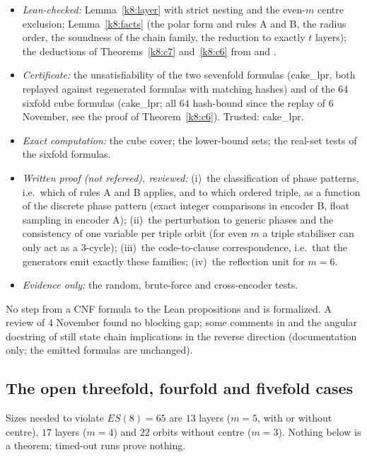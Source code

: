 \begin{itemize}
\item\emph{Lean-checked:} Lemma~\ref{k8:layer} with strict nesting and the even-$m$ centre exclusion;
Lemma~\ref{k8:facts} (the polar form and rules A and B, the radius order, the soundness of the chain family, the
reduction to exactly $t$ layers); the deductions of Theorems~\ref{k8:c7} and~\ref{k8:c6} from  and
.
\item\emph{Certificate:} the unsatisfiability of the two sevenfold formulas (cake\_lpr, both replayed against
regenerated formulas with matching hashes) and of the $64$ sixfold cube formulas (cake\_lpr; all $64$ hash-bound since
the replay of 6 November, see the proof of Theorem~\ref{k8:c6}). Trusted: cake\_lpr.
\item\emph{Exact computation:} the cube cover; the lower-bound sets; the real-set tests of the sixfold formulas.
\item\emph{Written proof (not refereed), reviewed:} (i)~the classification of phase patterns, i.e.\ which of rules A and
B applies, and to which ordered triple, as a function of the discrete phase pattern (exact integer comparisons in
encoder B, float sampling in encoder A); (ii)~the perturbation to generic phases and the consistency of one variable per
triple orbit (for even $m$ a triple stabiliser can only act as a $3$-cycle); (iii)~the code-to-clause correspondence,
i.e.\ that the generators emit exactly these families; (iv)~the reflection unit for $m=6$.
\item\emph{Evidence only:} the random, brute-force and cross-encoder tests.
\end{itemize}
No step from a CNF formula to the Lean propositions  and  is formalized. A review of
4 November found no blocking gap; some comments in  and the angular docstring of
 still state chain implications in the reverse direction (documentation only; the emitted formulas
are unchanged).

\subsection{The open threefold, fourfold and fivefold cases}

Sizes needed to violate $ES(8)=65$ are $13$ layers ($m=5$, with or without centre), $17$ layers ($m=4$) and $22$ orbits
without centre ($m=3$). Nothing below is a theorem; timed-out runs prove nothing.

